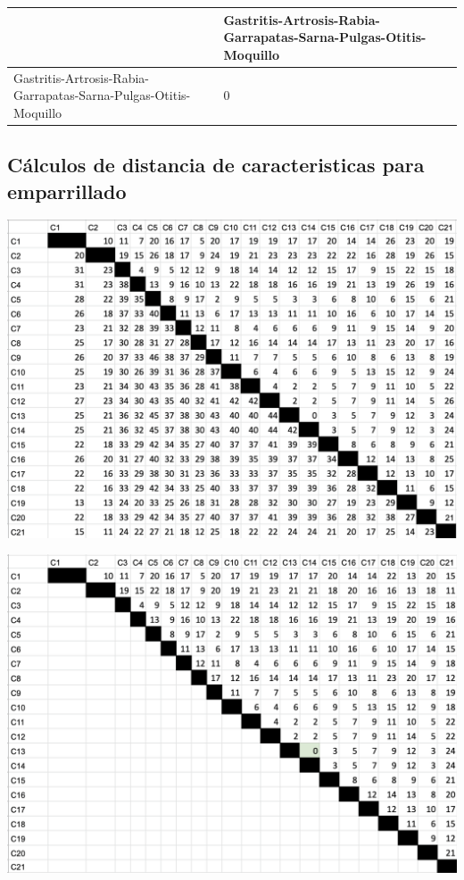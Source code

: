 \documentclass[a4paper,table,xcdraw]{article}
\begin{document}
\begin{longtable}{|m{150pt}|m{150pt}|}
\hline
                                                                 & Gastritis-Artrosis-Rabia-Garrapatas-Sarna-Pulgas-Otitis-Moquillo \\ \hline
\endhead
%
Gastritis-Artrosis-Rabia-Garrapatas-Sarna-Pulgas-Otitis-Moquillo & 0                                                                \\ \hline
\end{longtable}

\subsection{Cálculos de distancia de caracteristicas para emparrillado}

\includegraphics[scale=0.6]{./img/caracteristicas1.png}

\includegraphics[scale=0.6]{./img/caracteristicas2.png}
\end{document}
